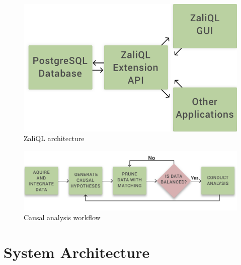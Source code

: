 \begin{figure}\center
 \includegraphics[scale=0.20]{Figures/System-Overview.png}
  \vspace{-3.3mm} \caption{ZaliQL architecture}

  \label{fig:arch}
  \vspace{-3mm}
\end{figure}


\begin{figure} \center
  \includegraphics[scale=0.21]{Figures/Matching-Flowchart.png}
  \vspace{2mm}\caption{Causal analysis workflow}

\label{fig:flowchart}
\vspace{-0.3cm}
\end{figure}

\vspace{-.3cm}

\section{System Architecture}

